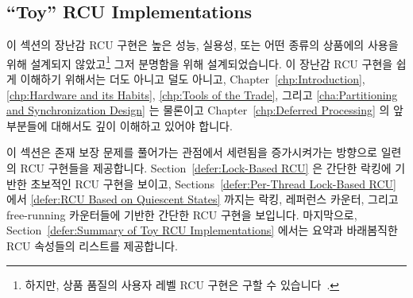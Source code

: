 
\subsection{``Toy'' RCU Implementations}
\label{sec:defer:``Toy'' RCU Implementations}

이 섹션의 장난감 RCU 구현은 높은 성능, 실용성, 또는 어떤 종류의 상품에의 사용을
위해 설계되지 않았고\footnote{
	하지만, 상품 품질의 사용자 레벨 RCU 구현은 구할 수
	있습니다~\cite{MathieuDesnoyers2009URCU}.}
그저 분명함을 위해 설계되었습니다.
이 장난감 RCU 구현을 쉽게 이해하기 위해서는 더도 아니고 덜도 아니고,
Chapter~\ref{chp:Introduction},
\ref{chp:Hardware and its Habits},
\ref{chp:Tools of the Trade}, 그리고
\ref{cha:Partitioning and Synchronization Design}
는 물론이고
Chapter~\ref{chp:Deferred Processing} 의 앞부분들에 대해서도 깊이 이해하고
있어야 합니다.
\iffalse

The toy RCU implementations in this section are designed not for
high performance, practicality, or any kind of production use,\footnote{
	However, production-quality user-level RCU implementations
	are available~\cite{MathieuDesnoyers2009URCU}.}
but rather for clarity.
Nevertheless, you will need a thorough understanding of
Chapters~\ref{chp:Introduction},
\ref{chp:Hardware and its Habits},
\ref{chp:Tools of the Trade}, and
\ref{cha:Partitioning and Synchronization Design},
as well as the previous portions of
Chapter~\ref{chp:Deferred Processing}
for even these toy RCU implementations to be easily understandable.
\fi

이 섹션은 존재 보장 문제를 풀어가는 관점에서 세련됨을 증가시켜가는 방향으로
일련의 RCU 구현들을 제공합니다.
Section~\ref{defer:Lock-Based RCU} 은 간단한 락킹에 기반한 초보적인 RCU 구현을
보이고,
Sections~\ref{defer:Per-Thread Lock-Based RCU} 에서
\ref{defer:RCU Based on Quiescent States}
까지는 락킹, 레퍼런스 카운터, 그리고 free-running 카운터들에 기반한 간단한 RCU
구현을 보입니다.
마지막으로, Section~\ref{defer:Summary of Toy RCU Implementations} 에서는
요약과 바래봄직한 RCU 속성들의 리스트를 제공합니다.
\iffalse

This section provides a series of RCU implementations in order of
increasing sophistication, from the viewpoint of solving the
existence-guarantee problem.
Section~\ref{defer:Lock-Based RCU} presents a rudimentary
RCU implementation based on simple locking, while
Sections~\ref{defer:Per-Thread Lock-Based RCU} through
\ref{defer:RCU Based on Quiescent States}
present a series of
simple RCU implementations based on locking, reference counters,
and free-running counters.
Finally, Section~\ref{defer:Summary of Toy RCU Implementations}
provides a summary and a list of desirable RCU properties.
\fi

